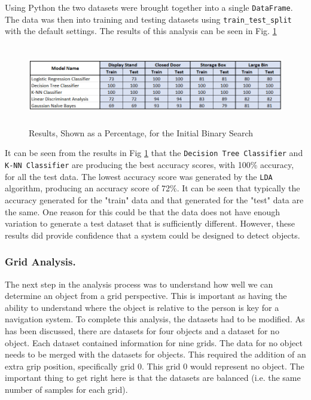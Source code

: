 \documentclass{svproc}
\begin{document}
Using Python the two datasets were brought together into a single \texttt{DataFrame}. The data was then into training and testing 
datasets using 
\texttt{train\_test\_split} with the default settings. The results of this analysis can be seen in Fig. \ref{fig:init_binary}

\begin{figure}[ht]
\includegraphics[width=12cm, height=3.5cm]{images/initial_binary_search.png}
\centering
\caption{Results, Shown as a Percentage, for the Initial Binary Search}
\label{fig:init_binary}
\end{figure}

It can be seen from the results in Fig \ref{fig:init_binary} that the \texttt{Decision Tree Classifier} and \texttt{K-NN Classifier} are 
producing the best accuracy scores, with 100\% accuracy, for all the test data. The lowest accuracy score was generated by the \texttt{LDA} 
algorithm, producing an accuracy score of 72\%. It can be seen that typically the accuracy generated for the "train" data and that generated 
for the "test" data are the same. One reason for this could be that the data does not have enough variation to generate a test dataset that 
is sufficiently different. However, these results did provide confidence that a system could be designed to detect objects. 

\subsubsection{Grid Analysis.}
The next step in the analysis process was to understand how well we can determine an object from a grid perspective. 
This is important as having the ability to understand where the object is relative to the person is key for a navigation system. To complete this 
analysis, the datasets had to be modified. As has been discussed, there are datasets for four objects and a dataset for no object. Each dataset 
contained information for nine grids. The data for no object needs to be merged with the datasets for objects. This required the addition of 
an extra grip position, specifically grid 0. This grid 0 would represent no object. The important thing to get right here is that the datasets 
are balanced (i.e. the same number of samples for each grid). 
\end{document}
